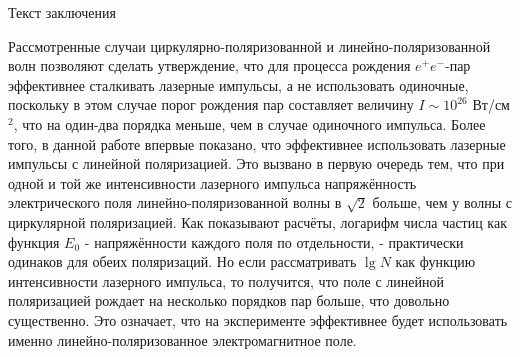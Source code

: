 \documentclass[a4paper,12pt]{article}         %
\begin{document}
Текст заключения

Рассмотренные случаи циркулярно-поляризованной и
линейно-поляризованной волн позволяют сделать утверждение, что для
процесса рождения $e^+e^-$-пар эффективнее сталкивать лазерные
импульсы, а не использовать одиночные, поскольку в этом случае порог
рождения пар составляет величину $I \sim 10^{26}$ Вт/см$^2$, что на
один-два порядка меньше, чем в случае одиночного импульса. Более
того, в данной работе впервые показано, что эффективнее использовать
лазерные импульсы с линейной поляризацией. Это вызвано в первую
очередь тем, что при одной и той же интенсивности лазерного импульса
напряжённость электрического поля линейно-поляризованной волны в
$\sqrt{2}$ больше, чем у волны с циркулярной поляризацией. Как
показывают расчёты, логарифм числа частиц как функция $E_0$ -
напряжённости каждого поля по отдельности, - практически одинаков
для обеих поляризаций. Но если рассматривать $\lg N$ как функцию
интенсивности лазерного импульса, то получится, что поле с линейной
поляризацией рождает на несколько порядков пар больше, что довольно
существенно. Это означает, что на эксперименте эффективнее будет
использовать именно линейно-поляризованное электромагнитное поле.



\newpage


\end{document}
